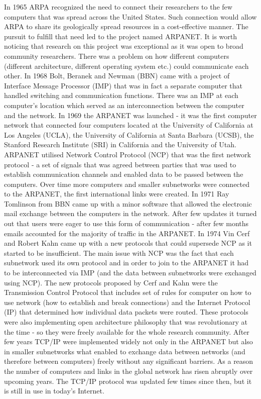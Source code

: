 \documentclass[magisterska,en]{pracamgr}
\begin{document}
In 1965 ARPA recognized the need to connect their researchers to the few computers that was spread across the United States. Such connection would allow ARPA to share its geologically spread resources in a cost-effective manner. The pursuit to fulfill that need led to the project named ARPANET. It is worth noticing that research on this project was exceptional as it was open to broad community researchers.\cite{an_early_history_of_the_internet} There was a problem on how different computers (different architecture, different operating system etc.) could communicate each other. In 1968 Bolt, Beranek and Newman (BBN) came with a project of Interface Message Processor (IMP) that was in fact a separate computer that handled switching and communication functions. There was an IMP at each computer's location which served as an interconnection between the computer and the network. In 1969 the ARPANET was launched - it was the first computer network that connected four computers located at the University of California at Los Angeles (UCLA), the University of California at Santa Barbara (UCSB), the Stanford Research Institute (SRI) in California and the University of Utah. ARPANET utilised Network Control Protocol (NCP) that was the first network protocol - a set of signals that was agreed between parties that was used to establish communication channels and enabled data to be passed between the computers. Over time more computers and smaller subnetworks were connected to the ARPANET, the first international links were created. In 1971 Ray Tomlinson from BBN came up with a minor software that allowed the electronic mail exchange between the computers in the network. After few updates it turned out that users were eager to use this form of communication - after few months emails accounted for the majority of traffic in the ARPANET.  \cite{an_early_history_of_the_internet} In 1974 Vin Cerf and Robert Kahn came up with a new protocols that could supersede NCP as it started to be insufficient. The main issue with NCP was the fact that each subnetwork used its own protocol and in order to join to the ARPANET it had to be interconnected via IMP (and the data between subnetworks were exchanged using NCP). \cite{an_early_history_of_the_internet} The new protocols proposed by Cerf and Kahn were the Transmission Control Protocol that includes set of rules for computer on how to use network (how to establish and break connections) and the Internet Protocol (IP) that determined how individual data packets were routed. These protocols were also implementing open architecture philosophy that was revolutionary at the time - so they were freely available for the whole research community. \cite{Internet_History_article} After few years TCP/IP were implemented widely not only in the ARPANET but also in smaller subnetworks what enabled to exchange data between networks (and therefore between computers) freely without any significant barriers. As a reason the number of computers and links in the global network has risen abruptly over upcoming years. The TCP/IP protocol was updated few times since then, but it is still in use in today's Internet. 
\end{document}
